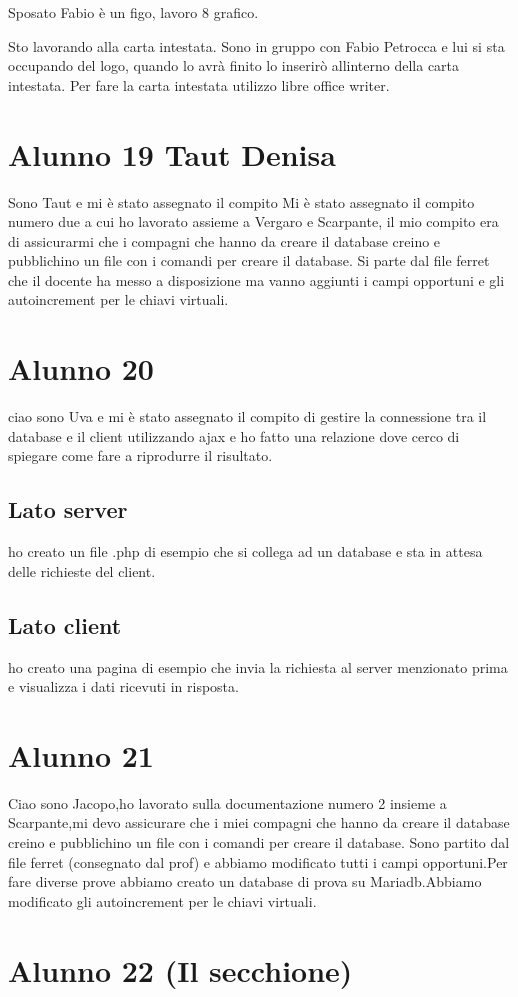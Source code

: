 Sposato Fabio è un figo, lavoro 8 grafico.

Sto lavorando alla carta intestata. Sono in gruppo con Fabio Petrocca e lui si sta occupando del logo, quando lo avrà finito lo inserirò all\textquotesingle{}interno della carta intestata. Per fare la carta intestata utilizzo libre office writer. \section*{Alunno 19 Taut Denisa}

Sono Taut e mi è stato assegnato il compito Mi è stato assegnato il compito numero due a cui ho lavorato assieme a Vergaro e Scarpante, il mio compito era di assicurarmi che i compagni che hanno da creare il database creino e pubblichino un file con i comandi per creare il database. Si parte dal file ferret che il docente ha messo a disposizione ma vanno aggiunti i campi opportuni e gli autoincrement per le chiavi virtuali. \section*{Alunno 20}

ciao sono Uva e mi è stato assegnato il compito di gestire la connessione tra il database e il client utilizzando ajax e ho fatto una relazione dove cerco di spiegare come fare a riprodurre il risultato. \subsection*{Lato server}

ho creato un file .php di esempio che si collega ad un database e sta in attesa delle richieste del client. \subsection*{Lato client}

ho creato una pagina di esempio che invia la richiesta al server menzionato prima e visualizza i dati ricevuti in risposta. \section*{Alunno 21}

Ciao sono Jacopo,ho lavorato sulla documentazione numero 2 insieme a Scarpante,mi devo assicurare che i miei compagni che hanno da creare il database creino e pubblichino un file con i comandi per creare il database. Sono partito dal file ferret (consegnato dal prof) e abbiamo modificato tutti i campi opportuni.\+Per fare diverse prove abbiamo creato un database di prova su Mariadb.\+Abbiamo modificato gli autoincrement per le chiavi virtuali. \section*{Alunno 22 (Il secchione)}

